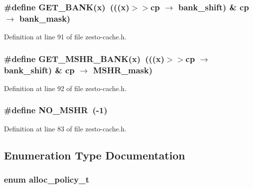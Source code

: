 \subsubsection[{GET\_\-BANK}]{\setlength{\rightskip}{0pt plus 5cm}\#define GET\_\-BANK(x)~(((x)$>$$>$cp $\rightarrow$ bank\_\-shift) \& cp $\rightarrow$ bank\_\-mask)}\label{zesto-cache_8h_1567854259cffa374f9ef7ba763e2586}




Definition at line 91 of file zesto-cache.h.
\subsubsection[{GET\_\-MSHR\_\-BANK}]{\setlength{\rightskip}{0pt plus 5cm}\#define GET\_\-MSHR\_\-BANK(x)~(((x)$>$$>$cp $\rightarrow$ bank\_\-shift) \& cp $\rightarrow$ MSHR\_\-mask)}\label{zesto-cache_8h_088d13f1f3edc2a38285413565b6a11e}




Definition at line 92 of file zesto-cache.h.
\subsubsection[{NO\_\-MSHR}]{\setlength{\rightskip}{0pt plus 5cm}\#define NO\_\-MSHR~(-1)}\label{zesto-cache_8h_47d3ac5bd49bbf1ff15859f38059ac97}




Definition at line 83 of file zesto-cache.h.

\subsection{Enumeration Type Documentation}
\subsubsection[{alloc\_\-policy\_\-t}]{\setlength{\rightskip}{0pt plus 5cm}enum {\bf alloc\_\-policy\_\-t}}\label{zesto-cache_8h_143ef0e79644952fb702e2fc59039a97}


